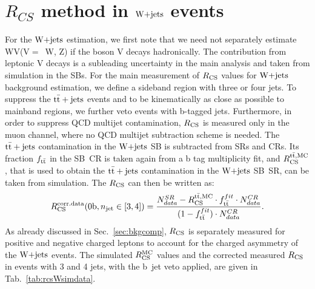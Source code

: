 \section{$R_{CS}$ method in $\textrm{W+jets}$ events}
\label{sec:RcsW}
For the $\textrm{W+jets}$ estimation, we first note that we need not separately estimate WV(V$=$~W, Z) if the boson V decays hadronically. The contribution from leptonic V decays is a subleading uncertainty in the main analysis and taken from simulation in the SBs.
For the main measurement of $R_{\rm CS}$ values for $\textrm{W+jets}$ background estimation, we define a sideband region with three or four jets. To suppress the ${\rm t\bar{t}+jets}$ events and to be kinematically as close as possible to mainband regions, we further veto events with b-tagged jets. 
Furthermore, in order to suppress QCD multijet contamination, $R_{\rm CS}$ is measured only in the muon channel, where no QCD multijet subtraction scheme is needed. The ${\rm t\bar{t}+jets}$ contamination in the $\textrm{W+jets}$ SB is subtracted from SRs and CRs. Its fraction $f_{\rm t\bar{t}}$ in the SB~CR is taken again from a b tag multiplicity fit, and $R_{\rm CS}^{\rm t\bar{t}, {\rm MC}}$, that is used to obtain the ${\rm t\bar{t}+jets}$ contamination in the $\textrm{W+jets}$ SB~SR, can be taken from simulation.
The $R_{\rm CS}$ can then be written as:
\begin{equation}
\label{RCSw}
{\ensuremath{R_{\rm CS}}^{\rm corr. data}({\rm 0b},\ensuremath{n_{\rm jet}}\in [3,4])} = \frac{N^{SR}_{data}-R_{\rm CS}^{\rm t\bar{t}, {\rm MC}}\cdot f^{fit}_{\rm t\bar{t}}\cdot N^{CR}_{data}}{(1-f^{fit}_{\rm t\bar{t}})\cdot N^{CR}_{data}}.
\end{equation}
As already discussed in Sec.~\ref{sec:bkgcomp}, $R_{\rm CS}$ is separately measured for positive and negative charged leptons to account for the charged asymmetry of the $\textrm{W+jets}$ events. The simulated $R_{\rm CS}^{\rm MC}$ values and the corrected measured $R_{\rm CS}$ in events with 3 and 4 jets, with the b~jet veto applied, are given in Tab.~\ref{tab:rcsWsimdata}.\\
